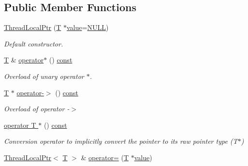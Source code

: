 \subsection*{Public Member Functions}
\begin{DoxyCompactItemize}
\item 
\hyperlink{classsf_1_1_thread_local_ptr_a8c678211d7828d2a8c41cb534422d649}{Thread\-Local\-Ptr} (\hyperlink{curses_8priv_8h_a5ef253115820acf7d27f3c5c3b02a0f0}{T} $\ast$\hyperlink{curses_8priv_8h_a3772851912abe3ccbff5c659ff71f2ff}{value}=\hyperlink{internal_8h_a070d2ce7b6bb7e5c05602aa8c308d0c4}{N\-U\-L\-L})
\begin{DoxyCompactList}\small\item\em Default constructor. \end{DoxyCompactList}\item 
\hyperlink{curses_8priv_8h_a5ef253115820acf7d27f3c5c3b02a0f0}{T} \& \hyperlink{classsf_1_1_thread_local_ptr_aa3bac9a08e8739613961659d10e0fadd}{operator$\ast$} () \hyperlink{term__entry_8h_a57bd63ce7f9a353488880e3de6692d5a}{const} 
\begin{DoxyCompactList}\small\item\em Overload of unary operator $\ast$. \end{DoxyCompactList}\item 
\hyperlink{curses_8priv_8h_a5ef253115820acf7d27f3c5c3b02a0f0}{T} $\ast$ \hyperlink{classsf_1_1_thread_local_ptr_aa0b559f78929b22cb2585cb2966edfb2}{operator-\/$>$} () \hyperlink{term__entry_8h_a57bd63ce7f9a353488880e3de6692d5a}{const} 
\begin{DoxyCompactList}\small\item\em Overload of operator -\/$>$ \end{DoxyCompactList}\item 
\hyperlink{classsf_1_1_thread_local_ptr_ab4a6a341c26b58f0ed3ef86502bd9572}{operator T $\ast$} () \hyperlink{term__entry_8h_a57bd63ce7f9a353488880e3de6692d5a}{const} 
\begin{DoxyCompactList}\small\item\em Conversion operator to implicitly convert the pointer to its raw pointer type (T$\ast$) \end{DoxyCompactList}\item 
\hyperlink{classsf_1_1_thread_local_ptr}{Thread\-Local\-Ptr}$<$ \hyperlink{curses_8priv_8h_a5ef253115820acf7d27f3c5c3b02a0f0}{T} $>$ \& \hyperlink{classsf_1_1_thread_local_ptr_a14dcf1cdf5f6b3bcdd633014b2b671f5}{operator=} (\hyperlink{curses_8priv_8h_a5ef253115820acf7d27f3c5c3b02a0f0}{T} $\ast$\hyperlink{curses_8priv_8h_a3772851912abe3ccbff5c659ff71f2ff}{value})

\end{DoxyCompactItemize}
